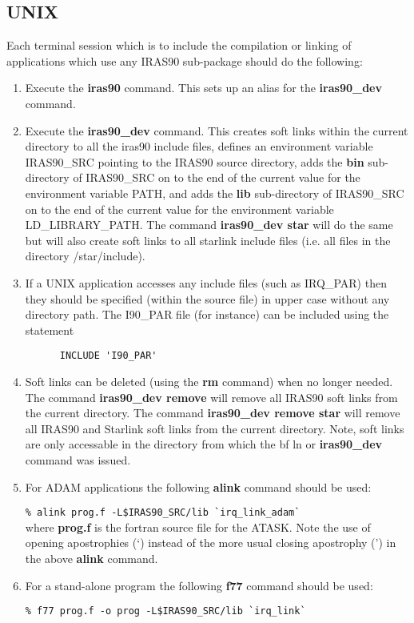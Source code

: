\subsection{UNIX}

Each terminal session which is to include the compilation or linking of
applications which use any IRAS90 sub-package should do the following:

\begin{enumerate}
\item Execute the {\bf iras90} command. This sets up an alias for the
{\bf iras90\_dev} command.

\item Execute the {\bf iras90\_dev} command.  This creates soft links
within the current directory to
all the iras90 include files, defines an environment variable IRAS90\_SRC
pointing to the IRAS90 source directory, adds the {\bf bin}
sub-directory of IRAS90\_SRC on to the end of the current value for the
environment variable PATH, and adds the {\bf lib} sub-directory of
IRAS90\_SRC on to the end of the current value for the environment
variable LD\_LIBRARY\_PATH. The command {\bf iras90\_dev star} will do
the same but will also create soft links to all starlink include files
(i.e. all files in the directory /star/include).

\item If a UNIX application accesses any include files (such as
IRQ\_PAR) then they should be specified (within the source file) in upper case
without any directory
path. The I90\_PAR file (for instance) can be included using the statement

\verb+      INCLUDE 'I90_PAR'+\\

\item Soft links can be deleted (using the {\bf rm} command) when no longer
needed.
The command {\bf iras90\_dev remove} will remove all IRAS90 soft links from
the current directory. The command {\bf iras90\_dev remove star} will
remove all IRAS90 and Starlink soft links from the current directory.
Note, soft links are only accessable in the directory from which the {bf ln}
or {\bf iras90\_dev} command was issued.
\item For ADAM applications the following {\bf alink} command should be used:

\verb+% alink prog.f -L$IRAS90_SRC/lib `irq_link_adam`+\\

where {\bf prog.f} is the fortran source file for the ATASK.
Note the use of opening apostrophies (`) instead of the more usual closing
apostrophy (') in the above {\bf alink} command.

\item For a stand-alone program the following {\bf f77} command should be used:

\verb+% f77 prog.f -o prog -L$IRAS90_SRC/lib `irq_link`+\\
\end{enumerate}


